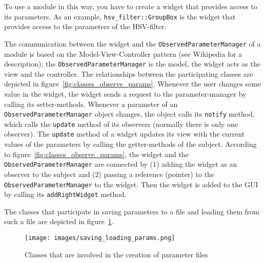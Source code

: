 \documentclass{article}
\newcommand{\code}[1]{\texttt{#1}}
\begin{document}
To use a module in this way, you have to create a widget that provides
access to its parameters.
As an example, \code{hsv\_filter::GroupBox} is the widget that provides access
to the parameters of the HSV-filter.

The communication between the widget and the \code{ObservedParameterManager} of
a module is based on the Model-View-Controller pattern (see Wikipedia for
a description);
the \code{ObservedParameterManager} is the model, the widget acts as the
view and the controller.
The relationships between the participating classes are depicted in
figure~\ref{fig:classes_observe_params}.
Whenever the user changes some value in the widget, the widget sends a request
to the parameter-manager by calling its setter-methods.
Whenever a parameter of an \code{ObservedParameterManager} object changes, the
object calls its \code{notify} method, which calls the \code{update} method
of its observers (normally there is only one observer).
The \code{update} method of a widget updates its view with the current values of
the parameters by calling the getter-methods of the subject.
According to figure~\ref{fig:classes_observe_params}, the widget and the
\code{ObservedParameterManager} are
connected by (1) adding the widget as an observer to the subject and (2)
passing a reference (pointer) to the \code{ObservedParameterManager} to the
widget.
Then the widget is added to the GUI by calling its \code{addRightWidget} method.


The classes that participate in saving parameters to a file and loading them
from such a file are depicted in figure~\ref{fig:classes_saving_loading}.
\begin{figure}
	\centering
	\texttt{[image: images/saving\_loading\_params.png]}
	\caption{Classes that are involved in the creation of parameter files}
	\label{fig:classes_saving_loading}
\end{figure}
\end{document}
